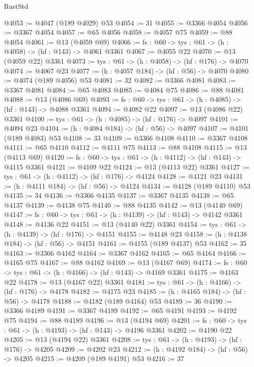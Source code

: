 \begin{lexlean}{RustStd}
\begin{coremodule}
@4053 := @4047 (@189 @4029) @53
@4054 := 31
@4055 := @3366 @4054
@4056 := @3367 @4054
@4057 := @65 @4056
@4058 := @4057 @75
@4059 := @88 @4054
@4061 := @13 (@4059 @69)
@4066 := {fs : @60} -> {tys : @61} -> (h : @4058) -> (hf : @143) -> @4061 @3361
@4067 := @4055 @22
@4070 := @13 (@4059 @22) @3361
@4073 := {tys : @61} -> (h : @4058) -> (hf : @176) -> @4070
@4074 := @4067 @23
@4077 := (h : @4057 @184) -> (hf : @56) -> @4070
@4080 := @4074 (@189 @4056) @53
@4081 := 32
@4082 := @3366 @4081
@4083 := @3367 @4081
@4084 := @65 @4083
@4085 := @4084 @75
@4086 := @88 @4081
@4088 := @13 (@4086 @69)
@4093 := {fs : @60} -> {tys : @61} -> (h : @4085) -> (hf : @143) -> @4088 @3361
@4094 := @4082 @22
@4097 := @13 (@4086 @22) @3361
@4100 := {tys : @61} -> (h : @4085) -> (hf : @176) -> @4097
@4101 := @4094 @23
@4104 := (h : @4084 @184) -> (hf : @56) -> @4097
@4107 := @4101 (@189 @4083) @53
@4108 := 33
@4109 := @3366 @4108
@4110 := @3367 @4108
@4111 := @65 @4110
@4112 := @4111 @75
@4113 := @88 @4108
@4115 := @13 (@4113 @69)
@4120 := {fs : @60} -> {tys : @61} -> (h : @4112) -> (hf : @143) -> @4115 @3361
@4121 := @4109 @22
@4124 := @13 (@4113 @22) @3361
@4127 := {tys : @61} -> (h : @4112) -> (hf : @176) -> @4124
@4128 := @4121 @23
@4131 := (h : @4111 @184) -> (hf : @56) -> @4124
@4134 := @4128 (@189 @4110) @53
@4135 := 34
@4136 := @3366 @4135
@4137 := @3367 @4135
@4138 := @65 @4137
@4139 := @4138 @75
@4140 := @88 @4135
@4142 := @13 (@4140 @69)
@4147 := {fs : @60} -> {tys : @61} -> (h : @4139) -> (hf : @143) -> @4142 @3361
@4148 := @4136 @22
@4151 := @13 (@4140 @22) @3361
@4154 := {tys : @61} -> (h : @4139) -> (hf : @176) -> @4151
@4155 := @4148 @23
@4158 := (h : @4138 @184) -> (hf : @56) -> @4151
@4161 := @4155 (@189 @4137) @53
@4162 := 35
@4163 := @3366 @4162
@4164 := @3367 @4162
@4165 := @65 @4164
@4166 := @4165 @75
@4167 := @88 @4162
@4169 := @13 (@4167 @69)
@4174 := {fs : @60} -> {tys : @61} -> (h : @4166) -> (hf : @143) -> @4169 @3361
@4175 := @4163 @22
@4178 := @13 (@4167 @22) @3361
@4181 := {tys : @61} -> (h : @4166) -> (hf : @176) -> @4178
@4182 := @4175 @23
@4185 := (h : @4165 @184) -> (hf : @56) -> @4178
@4188 := @4182 (@189 @4164) @53
@4189 := 36
@4190 := @3366 @4189
@4191 := @3367 @4189
@4192 := @65 @4191
@4193 := @4192 @75
@4194 := @88 @4189
@4196 := @13 (@4194 @69)
@4201 := {fs : @60} -> {tys : @61} -> (h : @4193) -> (hf : @143) -> @4196 @3361
@4202 := @4190 @22
@4205 := @13 (@4194 @22) @3361
@4208 := {tys : @61} -> (h : @4193) -> (hf : @176) -> @4205
@4209 := @4202 @23
@4212 := (h : @4192 @184) -> (hf : @56) -> @4205
@4215 := @4209 (@189 @4191) @53
@4216 := 37

\end{coremodule}
\end{lexlean}
